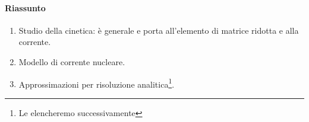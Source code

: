 \paragraph{Riassunto}
\begin{enumerate}
    \item Studio della cinetica: è generale e porta all'elemento di matrice ridotta e alla corrente.
    \item Modello di corrente nucleare.
    \item Approssimazioni per risoluzione analitica\footnote{Le elencheremo successivamente}.
\end{enumerate}